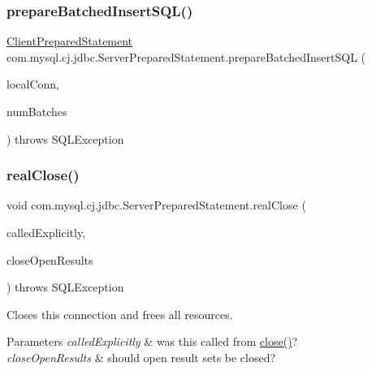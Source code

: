 \subsubsection{\texorpdfstring{prepare\+Batched\+Insert\+S\+Q\+L()}{prepareBatchedInsertSQL()}}
{\footnotesize\ttfamily \mbox{\hyperlink{classcom_1_1mysql_1_1cj_1_1jdbc_1_1_client_prepared_statement}{Client\+Prepared\+Statement}} com.\+mysql.\+cj.\+jdbc.\+Server\+Prepared\+Statement.\+prepare\+Batched\+Insert\+S\+QL (\begin{DoxyParamCaption}\item[{\mbox{\hyperlink{interfacecom_1_1mysql_1_1cj_1_1jdbc_1_1_jdbc_connection}{Jdbc\+Connection}}}]{local\+Conn,  }\item[{int}]{num\+Batches }\end{DoxyParamCaption}) throws S\+Q\+L\+Exception\hspace{0.3cm}{\ttfamily [protected]}}

\mbox{\label{classcom_1_1mysql_1_1cj_1_1jdbc_1_1_server_prepared_statement_a1bc3e61ca02b73fbbdcc74c8528b41eb}} 
\subsubsection{\texorpdfstring{real\+Close()}{realClose()}}
{\footnotesize\ttfamily void com.\+mysql.\+cj.\+jdbc.\+Server\+Prepared\+Statement.\+real\+Close (\begin{DoxyParamCaption}\item[{boolean}]{called\+Explicitly,  }\item[{boolean}]{close\+Open\+Results }\end{DoxyParamCaption}) throws S\+Q\+L\+Exception}

Closes this connection and frees all resources.


\begin{DoxyParams}{Parameters}
{\em called\+Explicitly} & was this called from \mbox{\hyperlink{classcom_1_1mysql_1_1cj_1_1jdbc_1_1_server_prepared_statement_abc26fe33d6a4b5ae00f85a355b6b7171}{close()}}? \\
\hline
{\em close\+Open\+Results} & should open result sets be closed?\\
\hline
\end{DoxyParams}

